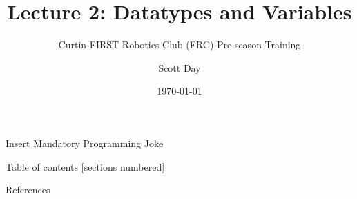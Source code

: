 \documentclass[9pt]{beamer}              %
\title{Lecture 2: Datatypes and Variables}
\subtitle{Curtin FIRST Robotics Club (FRC) Pre-season Training}
\date{\today}
\author{Scott Day}
\institute{Curtin University}
\begin{document}


\maketitle

\begin{frame}[fragile]{Insert Mandatory Programming Joke}
    \begin{center}
    \end{center}
\end{frame}

\begin{frame}{Table of contents}
  [sections numbered]
  \tableofcontents[hideallsubsections]
\end{frame}









\begin{frame}[allowframebreaks]{References}
  
  
\end{frame}

\end{document}
